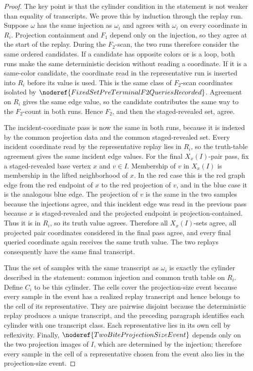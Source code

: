 \begin{proof}
The key point is that the cylinder condition in the statement is not weaker
than equality of transcripts.  We prove this by induction through the replay
run.  Suppose \(\omega\) has the same injection as \(\omega_i\) and agrees
with \(\omega_i\) on every coordinate in \(R_i\).  Projection containment and
\(F_1\) depend only on the injection, so they agree at the start of the replay.
During the \(F_2\)-scan, the two runs therefore consider the same ordered
candidates.  If a candidate has opposite colors or is a loop, both runs make
the same deterministic decision without reading a coordinate.  If it is a
same-color candidate, the coordinate read in the representative run is
inserted into \(R_i\) before its value is used.  This is the same class of
\(F_2\)-scan coordinates isolated by
\(\noderef{FixedSetPreTerminalF2QueriesRecorded}\).  Agreement on \(R_i\)
gives the same edge value, so the candidate contributes the same way to the
\(F_2\)-count in both runs.  Hence \(F_2\), and then the staged-revealed set,
agree.

The incident-coordinate pass is now the same in both runs, because it is
indexed by the common projection data and the common staged-revealed set.
Every incident coordinate read by the representative replay lies in \(R_i\),
so the truth-table agreement gives the same incident edge values.  For the
final \(X_x(I)\)-pair pass, fix a staged-revealed base vertex \(x\) and
\(v\in I\).  Membership of \(v\) in \(X_x(I)\) is membership in the lifted
neighborhood of \(x\).  In the red case this is the red graph edge from the
red endpoint of \(x\) to the red projection of \(v\), and in the blue case it
is the analogous blue edge.  The projection of \(v\) is the same in the two
samples because the injections agree, and this incident edge was read in the
previous pass because \(x\) is staged-revealed and the projected endpoint is
projection-contained.  Thus it is in \(R_i\), so its truth value agrees.
Therefore all \(X_x(I)\)-sets agree, all projected pair coordinates considered
in the final pass agree, and every final queried coordinate again receives the
same truth value.  The two replays consequently have the same final transcript.

Thus the set of samples with the same transcript as \(\omega_i\) is exactly
the cylinder described in the statement: common injection and common truth
table on \(R_i\).  Define \(C_i\) to be this cylinder.  The cells cover the
projection-size event because every sample in the event has a realized replay
transcript and hence belongs to the cell of its representative.  They are
pairwise disjoint because the deterministic replay produces a unique
transcript, and the preceding paragraph identifies each cylinder with one
transcript class.  Each representative lies in its own cell by reflexivity.
Finally, \(\noderef{TwoBiteProjectionSizeEvent}\) depends only on the two
projection images of \(I\), which are determined by the injection; therefore
every sample in the cell of a representative chosen from the event also lies
in the projection-size event.
\end{proof}

